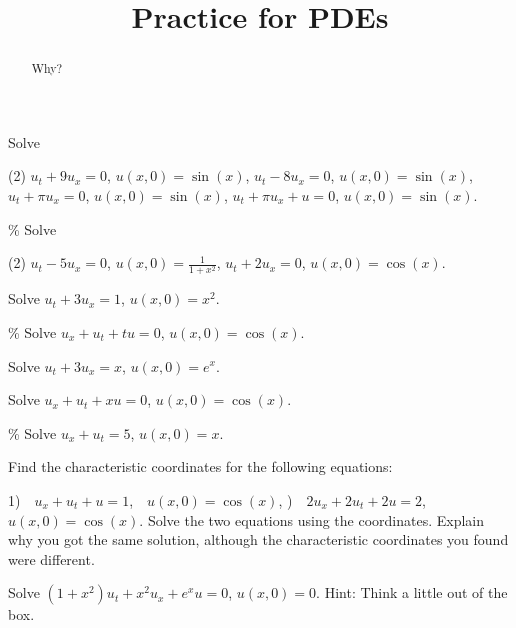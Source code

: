\documentclass{ximera}
\title{Practice for PDEs}
\begin{document}
\begin{abstract}
Why?
\end{abstract}
\maketitle


\begin{exercise}
    Solve
    \begin{tasks}(2)
        \task $u_t +9u_x = 0$, \enspace $u(x,0) = \sin(x)$,
        \task $u_t -8u_x = 0$, \enspace $u(x,0) = \sin(x)$,
        \task $u_t +\pi u_x = 0$, \enspace $u(x,0) = \sin(x)$,
        \task $u_t + \pi u_x + u = 0$, \enspace $u(x,0) = \sin(x)$.
    \end{tasks}
\end{exercise}

\begin{exercise}\%
    Solve
    \begin{tasks}(2)
        \task $u_t - 5u_x = 0$, $u(x,0) = \frac{1}{1+x^2}$,
        \task $u_t + 2u_x = 0$, $u(x,0) = \cos(x)$.
    \end{tasks}
\end{exercise}

\begin{exercise}
    Solve $u_t +3u_x = 1$, $u(x,0) = x^2$.
\end{exercise}

\begin{exercise}\%
    Solve $u_x+u_t+tu = 0$, $u(x,0) = \cos(x)$.
\end{exercise}

\begin{exercise}
    Solve $u_t +3u_x = x$, $u(x,0) = e^x$.
\end{exercise}

\begin{exercise}
    Solve $u_x+u_t+xu = 0$, $u(x,0) = \cos(x)$.
\end{exercise}

\begin{exercise}\%
    Solve $u_x+u_t = 5$, $u(x,0) = x$.
\end{exercise}

\begin{exercise}
    \begin{tasks}
        \task Find the characteristic coordinates for the following equations:
        
            1)~~$u_x+u_t + u = 1$,~~$u(x,0) = \cos(x)$,
            )~~$2u_x+2u_t +2u = 2$,~~$u(x,0) = \cos(x)$.
        \task Solve the two equations using the coordinates.
        \task Explain why you got the same solution, although the characteristic coordinates you found were different.
    \end{tasks}
\end{exercise}

\begin{exercise}
    Solve $(1+x^2) u_t + x^2 u_x + e^x u = 0$, $u(x,0) = 0$. Hint: Think a little out of the box.
\end{exercise}

\end{document}
